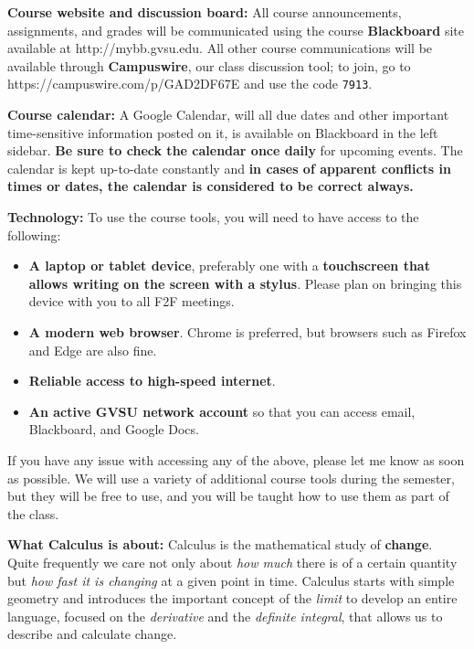 \documentclass[]{article}
\providecommand{\tightlist}{%
  \setlength{\itemsep}{0pt}\setlength{\parskip}{0pt}}
\begin{document}
\textbf{Course website and discussion board:} All course announcements,
assignments, and grades will be communicated using the course
\textbf{Blackboard} site available at http://mybb.gvsu.edu. All other
course communications will be available through \textbf{Campuswire}, our
class discussion tool; to join, go to https://campuswire.com/p/GAD2DF67E
and use the code \texttt{7913}.

\textbf{Course calendar:} A Google Calendar, will all due dates and
other important time-sensitive information posted on it, is available on
Blackboard in the left sidebar. \textbf{Be sure to check the calendar
once daily} for upcoming events. The calendar is kept up-to-date
constantly and \textbf{in cases of apparent conflicts in times or dates,
the calendar is considered to be correct always.}

\textbf{Technology:} To use the course tools, you will need to have
access to the following:

\begin{itemize}
\tightlist
\item
  \textbf{A laptop or tablet device}, preferably one with a
  \textbf{touchscreen that allows writing on the screen with a stylus}.
  Please plan on bringing this device with you to all F2F meetings.
\item
  \textbf{A modern web browser}. Chrome is preferred, but browsers such
  as Firefox and Edge are also fine.
\item
  \textbf{Reliable access to high-speed internet}.
\item
  \textbf{An active GVSU network account} so that you can access email,
  Blackboard, and Google Docs.
\end{itemize}

If you have any issue with accessing any of the above, please let me
know as soon as possible. We will use a variety of additional course
tools during the semester, but they will be free to use, and you will be
taught how to use them as part of the class.

\textbf{What Calculus is about:} Calculus is the mathematical study of
\textbf{change}. Quite frequently we care not only about \emph{how much}
there is of a certain quantity but \emph{how fast it is changing} at a
given point in time. Calculus starts with simple geometry and introduces
the important concept of the \emph{limit} to develop an entire language,
focused on the \emph{derivative} and the \emph{definite integral}, that
allows us to describe and calculate change.
\end{document}

